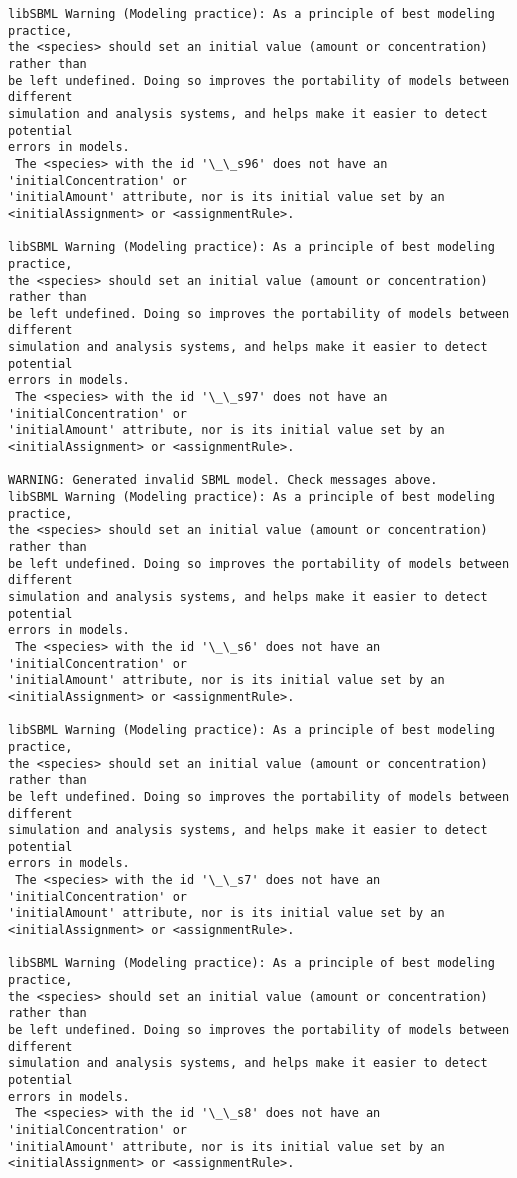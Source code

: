 \documentclass[11pt]{article}
\begin{document}
\begin{Verbatim}[commandchars=\\\{\}]
libSBML Warning (Modeling practice): As a principle of best modeling practice,
the <species> should set an initial value (amount or concentration) rather than
be left undefined. Doing so improves the portability of models between different
simulation and analysis systems, and helps make it easier to detect potential
errors in models.
 The <species> with the id '\_\_s96' does not have an 'initialConcentration' or
'initialAmount' attribute, nor is its initial value set by an
<initialAssignment> or <assignmentRule>.

libSBML Warning (Modeling practice): As a principle of best modeling practice,
the <species> should set an initial value (amount or concentration) rather than
be left undefined. Doing so improves the portability of models between different
simulation and analysis systems, and helps make it easier to detect potential
errors in models.
 The <species> with the id '\_\_s97' does not have an 'initialConcentration' or
'initialAmount' attribute, nor is its initial value set by an
<initialAssignment> or <assignmentRule>.

WARNING: Generated invalid SBML model. Check messages above.
libSBML Warning (Modeling practice): As a principle of best modeling practice,
the <species> should set an initial value (amount or concentration) rather than
be left undefined. Doing so improves the portability of models between different
simulation and analysis systems, and helps make it easier to detect potential
errors in models.
 The <species> with the id '\_\_s6' does not have an 'initialConcentration' or
'initialAmount' attribute, nor is its initial value set by an
<initialAssignment> or <assignmentRule>.

libSBML Warning (Modeling practice): As a principle of best modeling practice,
the <species> should set an initial value (amount or concentration) rather than
be left undefined. Doing so improves the portability of models between different
simulation and analysis systems, and helps make it easier to detect potential
errors in models.
 The <species> with the id '\_\_s7' does not have an 'initialConcentration' or
'initialAmount' attribute, nor is its initial value set by an
<initialAssignment> or <assignmentRule>.

libSBML Warning (Modeling practice): As a principle of best modeling practice,
the <species> should set an initial value (amount or concentration) rather than
be left undefined. Doing so improves the portability of models between different
simulation and analysis systems, and helps make it easier to detect potential
errors in models.
 The <species> with the id '\_\_s8' does not have an 'initialConcentration' or
'initialAmount' attribute, nor is its initial value set by an
<initialAssignment> or <assignmentRule>.


\end{Verbatim}
\end{document}
